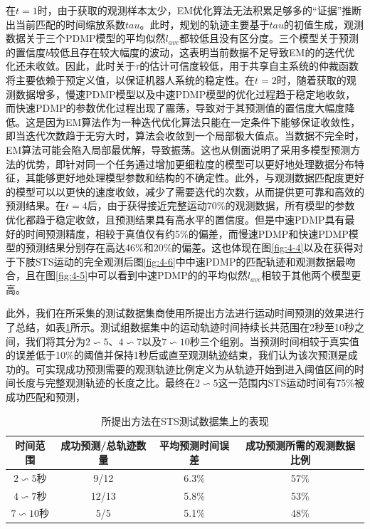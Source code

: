 在$t=1$时，由于获取的观测样本太少，EM优化算法无法积累足够多的``证据''推断出当前匹配的时间缩放系数$tau$。此时，规划的轨迹主要基于$tau$的初值生成，观测数据关于三个PDMP模型的平均似然$l_{ave}$都较低且没有区分度。三个模型关于预测的置信度$b$较低且存在较大幅度的波动，这表明当前数据不足导致EM的的迭代优化还未收敛。因此，此时关于$\tau$的估计可信度较低，用于共享自主系统的仲裁函数将主要依赖于预定义值，以保证机器人系统的稳定性。在$t=2$时，随着获取的观测数据增多，慢速PDMP模型以及中速PDMP模型的优化过程趋于稳定地收敛，而快速PDMP的参数优化过程出现了震荡，导致对于其预测值的置信度大幅度降低。这是因为EM算法作为一种迭代优化算法只能在一定条件下能够保证收敛性，即当迭代次数趋于无穷大时，算法会收敛到一个局部极大值点。当数据不完全时，EM算法可能会陷入局部最优解，导致振荡。这也从侧面说明了采用多模型预测方法的优势，即针对同一个任务通过增加更细粒度的模型可以更好地处理数据分布特征，其能够更好地处理模型参数和结构的不确定性。此外，与观测数据匹配度更好的模型可以以更快的速度收敛，减少了需要迭代的次数，从而提供更可靠和高效的预测结果。在$t=4$后，由于获得接近完整运动70\%的观测数据，所有模型的参数优化都趋于稳定收敛，且预测结果具有高水平的置信度。但是中速PDMP具有最好的时间预测精度，相较于真值仅有约5\%的偏差，而慢速PDMP和快速PDMP模型的预测结果分别存在高达46\%和20\%的偏差。这也体现在图\ref{fig:4-4}以及在获得对于下肢STS运动的完全观测后图\ref{fig:4-6}中中速PDMP的匹配轨迹和观测数据最吻合，且在图\ref{fig:4-5}中可以看到中速PDMP的的平均似然$l_{ave}$相较于其他两个模型更高。

此外，我们在所采集的测试数据集商使用所提出方法进行运动时间预测的效果进行了总结，如表\ref{tab:4-1}所示。测试组数据集中的运动轨迹时间持续长共范围在2秒至10秒之间，我们将其分为$2\backsim 5$、$4\backsim 7$以及$7\backsim 10$秒三个组别。当预测时间相较于真实值的误差低于10\%的阈值并保持1秒后或直至观测轨迹结束，我们认为该次预测是成功的。可实现成功预测需要的观测轨迹比例定义为从轨迹开始到进入阈值区间的时间长度与完整观测轨迹的长度之比。最终在$2\backsim 5$这一范围内STS运动时间有75\%被成功匹配和预测，

\begin{table}[htb]
    \centering
    \caption{所提出方法在STS测试数据集上的表现}
    \setlength{\tabcolsep}{5pt}
    \begin{tabular}{c c c c}
    \hline\hline
     时间范围 & 成功预测/总轨迹数量 & 平均预测时间误差 & 成功预测所需的观测数据比例\\  
    \hline
    $2\backsim 5$秒& 9/12 & 6.3\%& 57\%\\ 
    $4\backsim 7$秒& 12/13 & 5.8\%& 53\%\\ 
    $7\backsim 10$秒& 5/5 & 5.1\%& 48\%\\ 
    \hline\hline
    \end{tabular}
    \label{tab:4-1}
   \end{table}    

